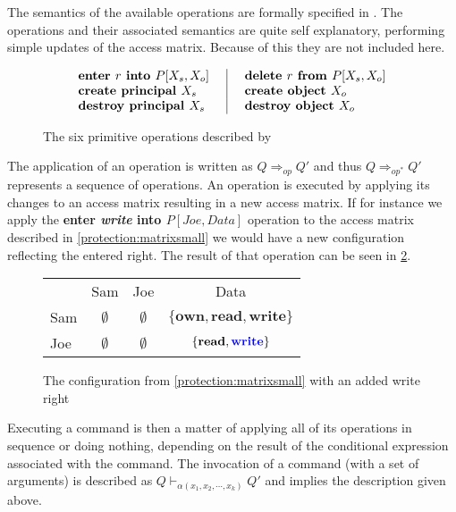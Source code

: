 The semantics of the available operations are formally specified in \citet[p. 463]{HRU}.
The operations and their associated semantics are quite self explanatory, performing simple updates of the access matrix.
Because of this they are not included here.

\begin{figure}[H]
 \centering
 \[\arraycolsep=14pt%
 \begin{array}{l|l}
  \textbf{enter } r \textbf{ into } P[X_s, X_o] & \textbf{delete } r \textbf{ from } P[X_s, X_o]\\
  \textbf{create \ssubject{} } X_s & \textbf{create object } X_o\\
  \textbf{destroy \ssubject{} } X_s & \textbf{destroy object } X_o
 \end{array}
 \]
 \caption{The six primitive operations described by \cite{HRU}}
 \label{protection:operations}
\end{figure}

The application of an operation is written as $Q \Rightarrow_{op} Q'$ and thus $Q \Rightarrow_{op^*} Q'$ represents a sequence of operations.
An operation is executed by applying its changes to an access matrix resulting in a new access matrix.
If for instance we apply the \textbf{enter \textit{write} into $P[Joe, Data]$} operation to the access matrix described in \cref{protection:matrixsmall} we would have a new configuration reflecting the entered right.
The result of that operation can be seen in \cref{protection:matrixwithwrite}.

\begin{figure}[H]
\centering
\begin{tabular}{l|c|c|c|}
\multicolumn{1}{c}{} & \multicolumn{1}{c}{Sam} & \multicolumn{1}{c}{Joe} & \multicolumn{1}{c}{Data} \\\cline{2-4}
Sam & $\emptyset$ & $\emptyset$ & $\{\textbf{own}, \textbf{read}, \textbf{write}\}$ \\\cline{2-4}
Joe & $\emptyset$ & $\emptyset$ & $\{\textbf{read}, {\color{blue}\textbf{write}}\}$ \\\cline{2-4}
\end{tabular}
\caption{The configuration from \cref{protection:matrixsmall} with an added write right}
\label{protection:matrixwithwrite}
\end{figure}

Executing a command is then a matter of applying all of its operations in sequence or doing nothing, depending on the result of the conditional expression associated with the command.
The invocation of a command (with a set of arguments) is described as $Q \vdash_{\alpha(x_1, x_2, \cdots, x_k)} Q'$ and implies the description given above.


